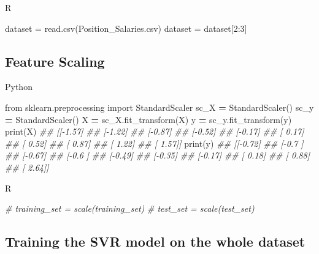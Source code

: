 \documentclass[
]{book}
\newenvironment{Shaded}{\begin{snugshade}}{\end{snugshade}}
\newcommand{\BuiltInTok}[1]{#1}
\newcommand{\CommentTok}[1]{\textcolor[rgb]{0.56,0.35,0.01}{\textit{#1}}}
\newcommand{\DecValTok}[1]{\textcolor[rgb]{0.00,0.00,0.81}{#1}}
\newcommand{\FunctionTok}[1]{\textcolor[rgb]{0.00,0.00,0.00}{#1}}
\newcommand{\ImportTok}[1]{#1}
\newcommand{\NormalTok}[1]{#1}
\newcommand{\OperatorTok}[1]{\textcolor[rgb]{0.81,0.36,0.00}{\textbf{#1}}}
\newcommand{\OtherTok}[1]{\textcolor[rgb]{0.56,0.35,0.01}{#1}}
\newcommand{\SpecialCharTok}[1]{\textcolor[rgb]{0.00,0.00,0.00}{#1}}
\newcommand{\StringTok}[1]{\textcolor[rgb]{0.31,0.60,0.02}{#1}}
\theoremstyle{definition}
\theoremstyle{definition}
\theoremstyle{definition}
\theoremstyle{definition}
\theoremstyle{remark}
\begin{document}
R

\begin{Shaded}
\begin{Highlighting}[]
\NormalTok{dataset }\OtherTok{=} \FunctionTok{read.csv}\NormalTok{(}\StringTok{\textquotesingle{}Position\_Salaries.csv\textquotesingle{}}\NormalTok{)}
\NormalTok{dataset }\OtherTok{=}\NormalTok{ dataset[}\DecValTok{2}\SpecialCharTok{:}\DecValTok{3}\NormalTok{]}
\end{Highlighting}
\end{Shaded}

\hypertarget{feature-scaling-1}{%
\subsection{Feature Scaling}\label{feature-scaling-1}}

Python

\begin{Shaded}
\begin{Highlighting}[]
\ImportTok{from}\NormalTok{ sklearn.preprocessing }\ImportTok{import}\NormalTok{ StandardScaler}
\NormalTok{sc\_X }\OperatorTok{=}\NormalTok{ StandardScaler()}
\NormalTok{sc\_y }\OperatorTok{=}\NormalTok{ StandardScaler()}
\NormalTok{X }\OperatorTok{=}\NormalTok{ sc\_X.fit\_transform(X)}
\NormalTok{y }\OperatorTok{=}\NormalTok{ sc\_y.fit\_transform(y)}
\BuiltInTok{print}\NormalTok{(X)}
\CommentTok{\#\# [[{-}1.57]}
\CommentTok{\#\#  [{-}1.22]}
\CommentTok{\#\#  [{-}0.87]}
\CommentTok{\#\#  [{-}0.52]}
\CommentTok{\#\#  [{-}0.17]}
\CommentTok{\#\#  [ 0.17]}
\CommentTok{\#\#  [ 0.52]}
\CommentTok{\#\#  [ 0.87]}
\CommentTok{\#\#  [ 1.22]}
\CommentTok{\#\#  [ 1.57]]}
\BuiltInTok{print}\NormalTok{(y)}
\CommentTok{\#\# [[{-}0.72]}
\CommentTok{\#\#  [{-}0.7 ]}
\CommentTok{\#\#  [{-}0.67]}
\CommentTok{\#\#  [{-}0.6 ]}
\CommentTok{\#\#  [{-}0.49]}
\CommentTok{\#\#  [{-}0.35]}
\CommentTok{\#\#  [{-}0.17]}
\CommentTok{\#\#  [ 0.18]}
\CommentTok{\#\#  [ 0.88]}
\CommentTok{\#\#  [ 2.64]]}
\end{Highlighting}
\end{Shaded}

R

\begin{Shaded}
\begin{Highlighting}[]
\CommentTok{\# training\_set = scale(training\_set)}
\CommentTok{\# test\_set = scale(test\_set)}
\end{Highlighting}
\end{Shaded}

\hypertarget{training-the-svr-model-on-the-whole-dataset}{%
\subsection{Training the SVR model on the whole dataset}\label{training-the-svr-model-on-the-whole-dataset}}
\end{document}
